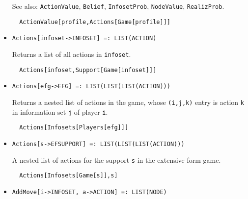 \begin{itemize}
\item [See also:] \verb+ActionValue+, \verb+Belief+,
\verb+InfosetProb+, \verb+NodeValue+, \verb+RealizProb+.  

\begin{verbatim}
  ActionValue[profile,Actions[Game[profile]]]
\end{verbatim} 

\ed

\item{}
\protect \large \begin{verbatim}
Actions[infoset->INFOSET] =: LIST(ACTION) 
\end{verbatim}\normalsize

\bd 
Returns a list of all actions in \verb+infoset+.

\begin{verbatim}
  Actions[infoset,Support[Game[infoset]]]
\end{verbatim} 
\ed

\item{}
\protect \large \begin{verbatim}
Actions[efg->EFG] =: LIST(LIST(LIST(ACTION))) 
\end{verbatim}\normalsize

\bd 
Returns a nested list of actions in the game, whose  \verb+(i,j,k)+
entry is action \verb+k+ in information set \verb+j+ of player \verb+i+.

\begin{verbatim}
  Actions[Infosets[Players[efg]]]
\end{verbatim} 
\ed

\item{}
\protect \large \begin{verbatim}
Actions[s->EFSUPPORT] =: LIST(LIST(LIST(ACTION))) 
\end{verbatim}\normalsize

\bd 

A nested list of actions for the support \verb+s+ in the extensive
form game.

\begin{verbatim}
  Actions[Infosets[Game[s]],s]
\end{verbatim} 
\ed

\item{}
\protect \large \begin{verbatim}
AddMove[i->INFOSET, a->ACTION] =: LIST(NODE) 
\end{verbatim}\normalsize


\end{itemize}
